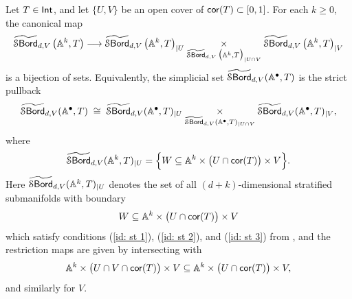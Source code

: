 \begin{proposition}\label{ch5:: prop: naive sheaf con}
Let $T\in \operatorname{\mathsf{Int}}$, and let $\{U,V\}$ be an open cover of $\operatorname{{\sf cor}}(T)\subset [0,1]$. For each $k\geq 0$, the canonical map
\begin{equation}
\label{ch5:: eq: naive sheaf interval levelwise}
\operatorname{\widetilde{\mathcal S\mathsf{Bord}}}_{d,V}\big(\mathbb A^{k},T\big)\longrightarrow
\operatorname{\widetilde{\mathcal S\mathsf{Bord}}}_{d,V}\big(\mathbb A^{k},T\big)_{|U}\underset{\operatorname{\widetilde{\mathcal S\mathsf{Bord}}}_{d,V}\big(\mathbb A^{k},T\big)_{|U\cap V}}{\times}
\operatorname{\widetilde{\mathcal S\mathsf{Bord}}}_{d,V}\big(\mathbb A^{k},T\big)_{|V}
\end{equation}
is a bijection of sets. Equivalently, the simplicial set $\operatorname{\widetilde{\mathcal S\mathsf{Bord}}}_{d,V}(\mathbb A^{\bullet},T)$ is the strict pullback
\begin{equation}
\label{ch5:: eq: naive sheaf interval simplicial}
\operatorname{\widetilde{\mathcal S\mathsf{Bord}}}_{d,V}(\mathbb A^{\bullet},T)\;\cong\;
\operatorname{\widetilde{\mathcal S\mathsf{Bord}}}_{d,V}(\mathbb A^{\bullet},T)_{|U}\underset{\operatorname{\widetilde{\mathcal S\mathsf{Bord}}}_{d,V}(\mathbb A^{\bullet},T)_{|U\cap V}}{\times}
\operatorname{\widetilde{\mathcal S\mathsf{Bord}}}_{d,V}(\mathbb A^{\bullet},T)_{|V},
\end{equation}
where
\begin{equation}
\label{ch5:: eq: bord-restriction-U}
\operatorname{\widetilde{\mathcal S\mathsf{Bord}}}_{d,V}(\mathbb A^{k},T)_{|U}
=
\Big\{
W\subseteq \mathbb A^{k}\times\big(U\cap \operatorname{{\sf cor}}(T)\big)\times V
\Big\}.
\end{equation}
Here $\operatorname{\widetilde{\mathcal S\mathsf{Bord}}}_{d,V}(\mathbb A^{k},T)_{|U}$ denotes the set of all $(d+k)$-dimensional stratified submanifolds with boundary
\[
W\subseteq \mathbb A^{k}\times\big(U\cap \operatorname{{\sf cor}}(T)\big)\times V
\]
which satisfy conditions (\ref{id: st 1}), (\ref{id: st 2}), and (\ref{id: st 3}) from , and the restriction maps are given by intersecting with
\[
\mathbb A^{k}\times\big(U\cap V\cap \operatorname{{\sf cor}}(T)\big)\times V\subseteq 
\mathbb A^{k}\times\big(U\cap\operatorname{{\sf cor}}(T)\big)\times V,
\]
and similarly for $V$.
\end{proposition}

